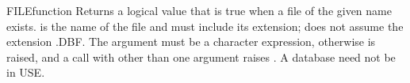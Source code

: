 \begin{XbaseEntry}{FILE}{function}
Returns a logical value that is true when a file of the given name exists.
\Syntax
{}
\Usage
{} is the name of the file and must include its extension;  does not assume the extension .DBF. The argument must be a character expression, otherwise  is raised, and a call with other than one argument raises . A database need not be in USE.
\Examples
{}
\end{XbaseEntry}

